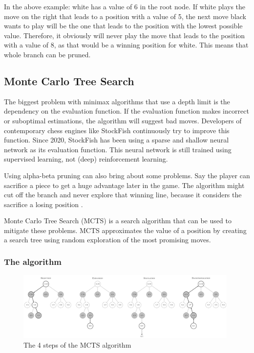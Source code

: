 \documentclass{article}
\begin{document}
In the above example: white has a value of 6 in the root node. 
If white plays the move on the right that leads to a position with a value of 5, 
the next move black wants to play will be the one that leads to the position 
with the lowest possible value. Therefore, it obviously will never play the move
that leads to the position with a value of 8, as that would be a winning position for
white. This means that whole branch can be pruned.

\subsection{Monte Carlo Tree Search}

The biggest problem with minimax algorithms that use a depth limit is the dependency on the evaluation function.
If the evaluation function makes incorrect or suboptimal estimations, the algorithm will suggest bad moves. 
Developers of contemporary chess engines like StockFish continuously try to improve this function. 
Since 2020, StockFish has been using a sparse and shallow neural network as its evaluation function. 
This neural network is still trained using supervised learning, not (deep) reinforcement learning.

Using alpha-beta pruning can also bring about some problems. Say the player can sacrifice a piece
to get a huge advantage later in the game. The algorithm might cut off the branch and never explore that winning line, 
because it considers the sacrifice a losing position \cite{MinimaxMonteCarlo}. 

Monte Carlo Tree Search (MCTS) \cite{MonteCarloTree2022} is a search algorithm that can be used to mitigate these problems.
MCTS approximates the value of a position by creating a search tree using random exploration of the most promising moves.

\subsubsection{The algorithm}

\begin{figure}[H]
    \centering
    \includegraphics[width=0.98\textwidth]{img/MCTS-steps.png}
    \caption{The 4 steps of the MCTS algorithm \cite{MonteCarloTree2022}}
\end{figure}
\end{document}
